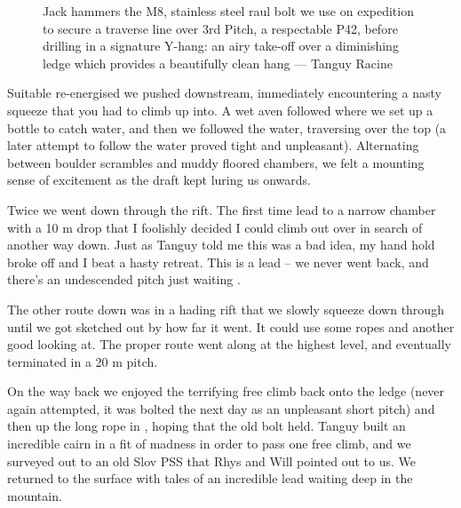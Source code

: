  
 \begin{figure}[t!]
\checkoddpage \ifoddpage \forcerectofloat \else \forceversofloat \fi
\centering
{}
\caption{Jack hammers the M8, stainless steel raul bolt we use on expedition to secure a traverse line over \protect{} 3rd Pitch, a respectable P42, before drilling in a signature Y-hang: an airy take-off over a diminishing ledge which provides a beautifully clean hang --- Tanguy Racine  }
\label{bolt M8}
\end{figure}

Suitable re-energised we pushed downstream, immediately encountering a nasty squeeze that you had to climb up into. A wet aven followed where we set up a bottle to catch water, and then we followed the water, traversing over the top (a later attempt to follow the water proved tight and unpleasant). Alternating between boulder scrambles and muddy floored chambers, we felt a mounting sense of excitement as the draft kept luring us onwards.
 
Twice we went down through the rift. The first time lead to a narrow chamber with a 10 m drop that I foolishly decided I could climb out over in search of another way down. Just as Tanguy told me this was a bad idea, my hand hold broke off and I beat a hasty retreat. This is a lead -- we never went back, and there's an undescended pitch just waiting .
 
The other route down was in a hading rift that we slowly squeeze down through until we got sketched out by how far it went. It could use some ropes and another good looking at. The proper route went along at the highest level, and eventually terminated in a 20 m pitch.
 
On the way back we enjoyed the terrifying free climb back onto the ledge (never again attempted, it was bolted the next day as an unpleasant short pitch) and then up the long rope in , hoping that the old bolt held. Tanguy built an incredible cairn in a fit of madness in order to pass one free climb, and we surveyed out to an old Slov PSS that Rhys and Will pointed out to us. We returned to the surface with tales of an incredible lead waiting deep in the mountain.

